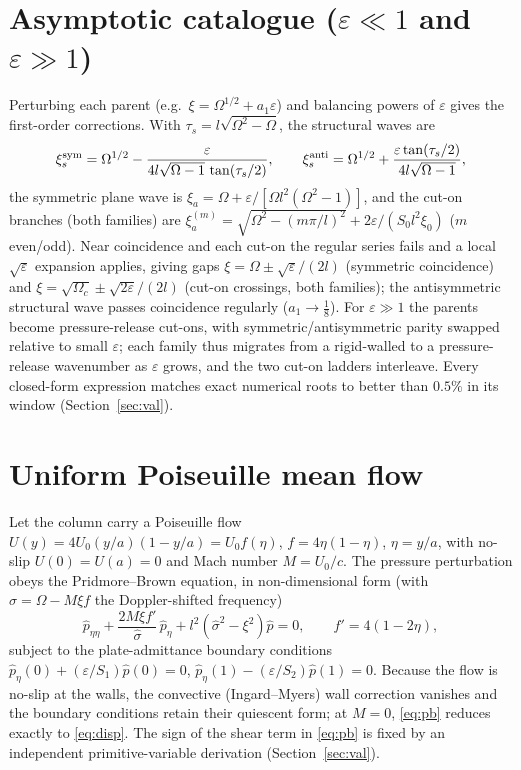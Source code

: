 \documentclass[11pt]{article}
\newcommand{\Om}{\Omega}
\newcommand{\eps}{\varepsilon}
\begin{document}
\section{Asymptotic catalogue ($\eps\ll1$ and $\eps\gg1$)}
Perturbing each parent (e.g.\ $\xi=\Om^{1/2}+a_1\eps$) and balancing powers of $\eps$ gives the
first-order corrections. With $\tau_s=l\sqrt{\Om^2-\Om}$, the structural waves are
\begin{equation}
\xi_s^{\rm sym}=\Om^{1/2}-\frac{\eps}{4l\sqrt{\Om-1}\,\tan(\tau_s/2)},\qquad
\xi_s^{\rm anti}=\Om^{1/2}+\frac{\eps\tan(\tau_s/2)}{4l\sqrt{\Om-1}},
\end{equation}
the symmetric plane wave is $\xi_a=\Om+\eps/[\Om l^2(\Om^2-1)]$, and the cut-on branches
(both families) are $\xi_a^{(m)}=\sqrt{\Om^2-(m\pi/l)^2}+2\eps/(S_0l^2\xi_0)$ ($m$ even/odd). Near
coincidence and each cut-on the regular series fails and a local $\sqrt{\eps}$ expansion applies,
giving gaps $\xi=\Om\pm\sqrt{\eps}/(2l)$ (symmetric coincidence) and
$\xi=\sqrt{\Om_c}\pm\sqrt{2\eps}/(2l)$ (cut-on crossings, both families); the antisymmetric structural
wave passes coincidence regularly ($a_1\to\tfrac18$). For $\eps\gg1$ the parents become
pressure-release cut-ons, with symmetric/antisymmetric parity swapped relative to small $\eps$; each
family thus migrates from a rigid-walled to a pressure-release wavenumber as $\eps$ grows, and the two
cut-on ladders interleave. Every closed-form expression matches exact numerical roots to better than
$0.5\%$ in its window (Section~\ref{sec:val}).

\section{Uniform Poiseuille mean flow}
Let the column carry a Poiseuille flow $U(y)=4U_0(y/a)(1-y/a)=U_0f(\eta)$, $f=4\eta(1-\eta)$,
$\eta=y/a$, with no-slip $U(0)=U(a)=0$ and Mach number $M=U_0/c$. The pressure perturbation obeys the
Pridmore--Brown equation, in non-dimensional form (with $\hat\sigma=\Om-M\xi f$ the Doppler-shifted
frequency)
\begin{equation}
\hat p_{\eta\eta}+\frac{2M\xi f'}{\hat\sigma}\,\hat p_\eta+l^2(\hat\sigma^2-\xi^2)\hat p=0,
\qquad f'=4(1-2\eta),
\label{eq:pb}
\end{equation}
subject to the plate-admittance boundary conditions $\hat p_\eta(0)+(\eps/S_1)\hat p(0)=0$,
$\hat p_\eta(1)-(\eps/S_2)\hat p(1)=0$. Because the flow is no-slip at the walls, the convective
(Ingard--Myers) wall correction vanishes and the boundary conditions retain their quiescent form; at
$M=0$, \eqref{eq:pb} reduces exactly to \eqref{eq:disp}. The sign of the shear term in \eqref{eq:pb}
is fixed by an independent primitive-variable derivation (Section~\ref{sec:val}).
\end{document}
